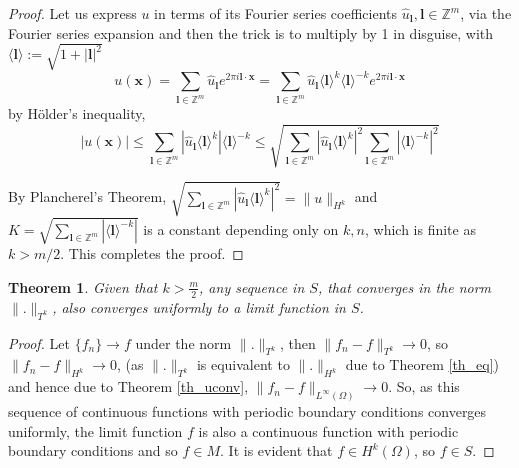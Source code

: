\documentclass[multixcb]{amstext-l}
\theoremstyle{plain}
\newtheorem{theorem}{Theorem}[chapter]
\theoremstyle{definition}
\theoremstyle{definition}
\theoremstyle{remark}
\numberwithin{equation}{chapter}
\begin{document}
\begin{appendix}
\begin{proof}
Let us express $u$ in terms of its Fourier series coefficients $\hat u_{\boldsymbol{l}},\boldsymbol{l} \in \mathbb{Z}^m$, via the Fourier series expansion and then the trick is to multiply by 1 in disguise, with $\langle \boldsymbol{l}\rangle := \sqrt{1+|\boldsymbol{l}|^2}$  
\begin{equation}
u(\boldsymbol{x}) = \sum\limits_{\boldsymbol{l}\in \mathbb{Z}^m} \hat u_{\boldsymbol{l}}e^{2\pi i \boldsymbol{l}\cdot \boldsymbol{x}}  = \sum\limits_{\boldsymbol{l}\in \mathbb{Z}^m} \hat u_{\boldsymbol{l}} \langle \boldsymbol{l}\rangle^k \langle \boldsymbol{l}\rangle^{-k} e^{2\pi i \boldsymbol{l}\cdot \boldsymbol{x}} 
\end{equation}
by Hölder's inequality,
\begin{equation}
 |u(\boldsymbol{x})| \le \sum\limits_{\boldsymbol{l}\in \mathbb{Z}^m} \left |\hat u_{\boldsymbol{l}}\langle \boldsymbol{l}\rangle^k \right| \langle \boldsymbol{l}\rangle^{-k} \le \sqrt{\sum\limits_{\boldsymbol{l}\in \mathbb{Z}^m}|\hat u_{\boldsymbol{l}}\langle \boldsymbol{l}\rangle^{k}|^2 \sum\limits_{\boldsymbol{l}\in \mathbb{Z}^m}|\langle \boldsymbol{l}\rangle^{-k}|^2}   
\end{equation} 

By Plancherel's Theorem, $\sqrt{\sum\limits_{\boldsymbol{l}\in \mathbb{Z}^m}|\hat u_{\boldsymbol{l}}\langle \boldsymbol{l}\rangle^{k}|^2} = \|u\|_{H^{k}}$ and 
$K = \sqrt{\sum\limits_{\boldsymbol{l}\in \mathbb{Z}^m}|\langle \boldsymbol{l}\rangle^{-k}|}$ is a constant depending only on  $k,n$, which is finite as $k > m/2$. This completes the proof.
\end{proof}



\begin{theorem}
\label{completeness}
Given that $k>\frac{m}{2}$, any sequence in $S$, that converges in the norm $\|.\|_{T^k}$, also converges uniformly to a limit function in $S$.
\end{theorem}

\begin{proof}
Let $\{f_n\}\to f$ under the norm $\|.\|_{T^k}$, then $\|f_n-f\|_{T^k}\to 0$, so $\|f_n-f\|_{H^k} \to 0$, (as $\|.\|_{T^k}$ is equivalent to $\|.\|_{H^k}$ due to Theorem \ref{th_eq}) and hence due to Theorem \ref{th_uconv}, $\|f_n-f\|_{L^{\infty}(\Omega)} \to 0$. So, as this sequence of continuous functions with periodic boundary conditions converges uniformly, the limit function $f$ is also a continuous function with periodic boundary conditions and so $f\in M $. It is evident that $f \in H^k(\Omega)$, so $f\in S$. 
\end{proof}


\end{appendix}
\end{document}
